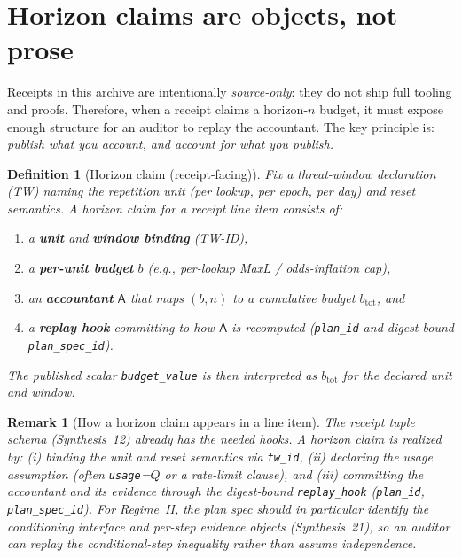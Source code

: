 \documentclass[11pt]{article}
\newtheorem{definition}{Definition}
\newtheorem{remark}{Remark}
\begin{document}
\section{Horizon claims are objects, not prose}
Receipts in this archive are intentionally \emph{source-only}: they do not ship full tooling and proofs.
Therefore, when a receipt claims a horizon-$n$ budget, it must expose enough structure for an auditor to replay the accountant.
The key principle is: \emph{publish what you account, and account for what you publish.}

\begin{definition}[Horizon claim (receipt-facing)]\label{def:horizonclaim}
Fix a threat-window declaration (TW) naming the repetition unit (per lookup, per epoch, per day) and reset semantics.\cite{series:threatwindows}
A \emph{horizon claim} for a receipt line item consists of:
\begin{enumerate}[leftmargin=*]
\item a \textbf{unit} and \textbf{window binding} (TW-ID),
\item a \textbf{per-unit budget} $b$ (e.g., per-lookup MaxL / odds-inflation cap),
\item an \textbf{accountant} $\mathsf{A}$ that maps $(b,n)$ to a cumulative budget $b_{\mathrm{tot}}$, and
\item a \textbf{replay hook} committing to how $\mathsf{A}$ is recomputed (\texttt{plan\_id} and digest-bound \texttt{plan\_spec\_id}).\cite{series:receiptitems,series:planstateequiv}
\end{enumerate}
The published scalar \texttt{budget\_value} is then interpreted as $b_{\mathrm{tot}}$ for the declared unit and window.
\end{definition}



\begin{remark}[How a horizon claim appears in a line item]
The receipt tuple schema (Synthesis~12) already has the needed hooks.\cite{series:receiptitems}
A horizon claim is realized by:
(i) binding the unit and reset semantics via \texttt{tw\_id},
(ii) declaring the usage assumption (often \texttt{usage}=$Q$ or a rate-limit clause), and
(iii) committing the \emph{accountant} and its evidence through the digest-bound \texttt{replay\_hook} (\texttt{plan\_id}, \texttt{plan\_spec\_id}).\cite{series:planstateequiv}
For Regime~II, the plan spec should in particular identify the conditioning interface and per-step evidence objects (Synthesis~21), so an auditor can replay the conditional-step inequality rather than assume independence.\cite{series:condcert}
\end{remark}
\end{document}
